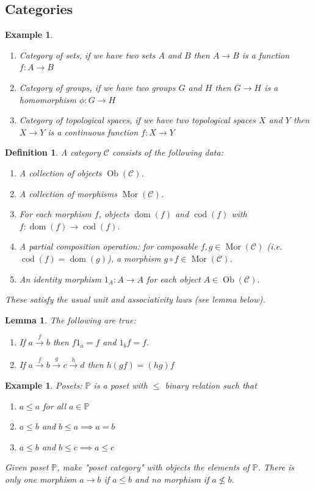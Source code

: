 \documentclass[a4paper,12pt]{article}
\newtheorem{lem}[thm]{Lemma}
\newtheorem{defn}[thm]{Definition}
\newtheorem{eg}[thm]{Example}
\begin{document}
\subsection{Categories}
\begin{eg}
    \begin{enumerate}
        \item Category of sets, if we have two sets $A$ and $B$ then $A\to B$ is a function $f:A\to B$
        \item Category of groups, if we have two groups $G$ and $H$ then $G\to H$ is a homomorphism $\phi:G\to H$
        \item Category of topological spaces, if we have two topological spaces $X$ and $Y$ then $X\to Y$ is a continuous function $f:X\to Y$
    \end{enumerate}
\end{eg}
\begin{defn}
    A category $\mathcal{C}$ consists of the following data:
    \begin{enumerate}
        \item A collection of objects $\operatorname{Ob}(\mathcal{C})$.
        \item A collection of morphisms $\operatorname{Mor}(\mathcal{C})$.
        \item For each morphism $f$, objects $\operatorname{dom}(f)$ and $\operatorname{cod}(f)$ with $f:\operatorname{dom}(f)\to \operatorname{cod}(f)$.
        \item A partial composition operation: for composable $f,g\in \operatorname{Mor}(\mathcal{C})$ (i.e.\ $\operatorname{cod}(f)=\operatorname{dom}(g)$), a morphism $g\circ f\in \operatorname{Mor}(\mathcal{C})$.
        \item An identity morphism $1_A:A\to A$ for each object $A\in \operatorname{Ob}(\mathcal{C})$.
    \end{enumerate}
    These satisfy the usual unit and associativity laws (see lemma below).
\end{defn}
\begin{lem}
    The following are true:
    \begin{enumerate}
        \item If $a \xrightarrow{f} b$ then $f 1_a = f$ and $1_b f = f$.
        \item If $a \xrightarrow{f} b \xrightarrow{g} c \xrightarrow{h} d$ then $h(gf)=(hg)f$
    \end{enumerate}
\end{lem}
\begin{eg}
    Posets: $\mathbb{P}$ is a poset with $\leq$ binary relation such that \begin{enumerate}
        \item $a\leq a$ for all $a\in \mathbb{P}$
        \item $a\leq b$ and $b\leq a\implies a=b$
        \item $a\leq b$ and $b\leq c\implies a\leq c$
    \end{enumerate}
    Given poset $\mathbb{P}$, make "poset category" with objects the elements of $\mathbb{P}$. There is only one morphism $a\to b$ if $a\leq b$ and no morphism if $a\not\leq b$.
\end{eg}
\end{document}
